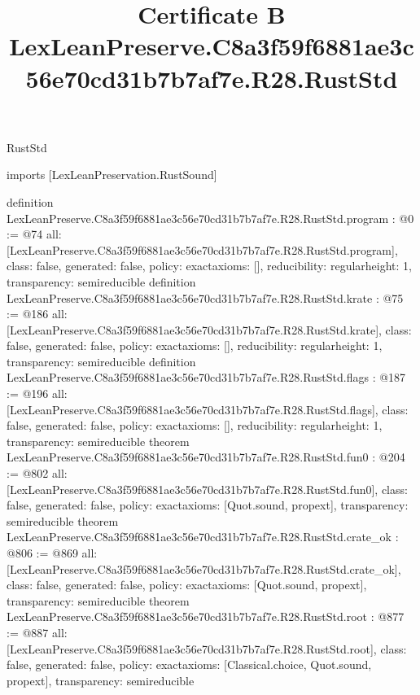 \begin{lexlean}{RustStd}
\title{Certificate B LexLeanPreserve.C8a3f59f6881ae3c56e70cd31b7b7af7e.R28.RustStd}
\begin{coremodule}
imports [LexLeanPreservation.RustSound]

definition LexLeanPreserve.C8a3f59f6881ae3c56e70cd31b7b7af7e.R28.RustStd.program : @0 := @74 {
  all: [LexLeanPreserve.C8a3f59f6881ae3c56e70cd31b7b7af7e.R28.RustStd.program],
  class: false,
  generated: false,
  policy: exact{axioms: []},
  reducibility: regular{height: 1},
  transparency: semireducible
}
definition LexLeanPreserve.C8a3f59f6881ae3c56e70cd31b7b7af7e.R28.RustStd.krate : @75 := @186 {
  all: [LexLeanPreserve.C8a3f59f6881ae3c56e70cd31b7b7af7e.R28.RustStd.krate],
  class: false,
  generated: false,
  policy: exact{axioms: []},
  reducibility: regular{height: 1},
  transparency: semireducible
}
definition LexLeanPreserve.C8a3f59f6881ae3c56e70cd31b7b7af7e.R28.RustStd.flags : @187 := @196 {
  all: [LexLeanPreserve.C8a3f59f6881ae3c56e70cd31b7b7af7e.R28.RustStd.flags],
  class: false,
  generated: false,
  policy: exact{axioms: []},
  reducibility: regular{height: 1},
  transparency: semireducible
}
theorem LexLeanPreserve.C8a3f59f6881ae3c56e70cd31b7b7af7e.R28.RustStd.fun0 : @204 := @802 {
  all: [LexLeanPreserve.C8a3f59f6881ae3c56e70cd31b7b7af7e.R28.RustStd.fun0],
  class: false,
  generated: false,
  policy: exact{axioms: [Quot.sound, propext]},
  transparency: semireducible
}
theorem LexLeanPreserve.C8a3f59f6881ae3c56e70cd31b7b7af7e.R28.RustStd.crate_ok : @806 := @869 {
  all: [LexLeanPreserve.C8a3f59f6881ae3c56e70cd31b7b7af7e.R28.RustStd.crate_ok],
  class: false,
  generated: false,
  policy: exact{axioms: [Quot.sound, propext]},
  transparency: semireducible
}
theorem LexLeanPreserve.C8a3f59f6881ae3c56e70cd31b7b7af7e.R28.RustStd.root : @877 := @887 {
  all: [LexLeanPreserve.C8a3f59f6881ae3c56e70cd31b7b7af7e.R28.RustStd.root],
  class: false,
  generated: false,
  policy: exact{axioms: [Classical.choice, Quot.sound, propext]},
  transparency: semireducible
}


\end{coremodule}
\end{lexlean}
